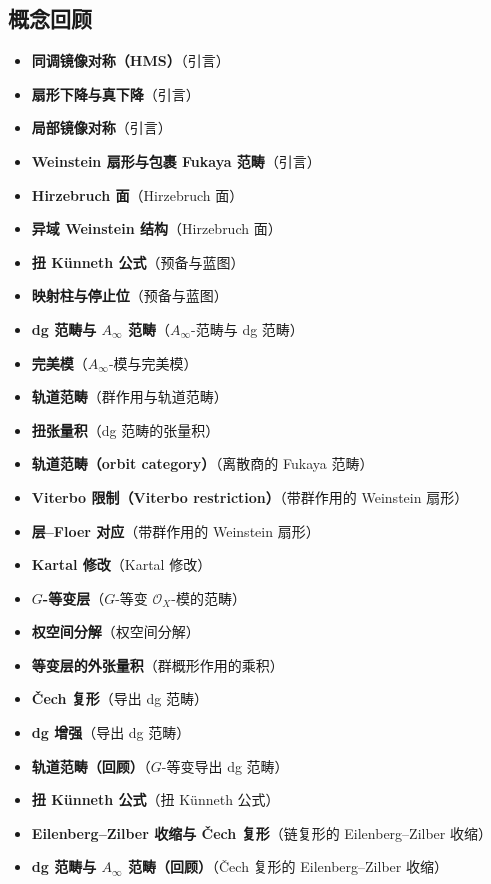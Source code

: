\subsection*{概念回顾}
\begin{itemize}[leftmargin=1.2em,itemsep=1pt]
\item \textbf{同调镜像对称（HMS）}\quad（引言）
\item \textbf{扇形下降与真下降}\quad（引言）
\item \textbf{局部镜像对称}\quad（引言）
\item \textbf{Weinstein 扇形与包裹 Fukaya 范畴}\quad（引言）
\item \textbf{Hirzebruch 面}\quad（Hirzebruch 面）
\item \textbf{异域 Weinstein 结构}\quad（Hirzebruch 面）
\item \textbf{扭 Künneth 公式}\quad（预备与蓝图）
\item \textbf{映射柱与停止位}\quad（预备与蓝图）
\item \textbf{dg 范畴与 $A_{\infty}$ 范畴}\quad（$A_{\infty}$-范畴与 dg 范畴）
\item \textbf{完美模}\quad（$A_{\infty}$-模与完美模）
\item \textbf{轨道范畴}\quad（群作用与轨道范畴）
\item \textbf{扭张量积}\quad（dg 范畴的张量积）
\item \textbf{轨道范畴（orbit category）}\quad（离散商的 Fukaya 范畴）
\item \textbf{Viterbo 限制（Viterbo restriction）}\quad（带群作用的 Weinstein 扇形）
\item \textbf{层--Floer 对应}\quad（带群作用的 Weinstein 扇形）
\item \textbf{Kartal 修改}\quad（Kartal 修改）
\item \textbf{$G$-等变层}\quad（$G$-等变 $\mathcal{O}_X$-模的范畴）
\item \textbf{权空间分解}\quad（权空间分解）
\item \textbf{等变层的外张量积}\quad（群概形作用的乘积）
\item \textbf{Čech 复形}\quad（导出 dg 范畴）
\item \textbf{dg 增强}\quad（导出 dg 范畴）
\item \textbf{轨道范畴（回顾）}\quad（$G$-等变导出 dg 范畴）
\item \textbf{扭 Künneth 公式}\quad（扭 Künneth 公式）
\item \textbf{Eilenberg–Zilber 收缩与 Čech 复形}\quad（链复形的 Eilenberg--Zilber 收缩）
\item \textbf{dg 范畴与 $A_\infty$ 范畴（回顾）}\quad（\v{C}ech 复形的 Eilenberg--Zilber 收缩）
\end{itemize}
